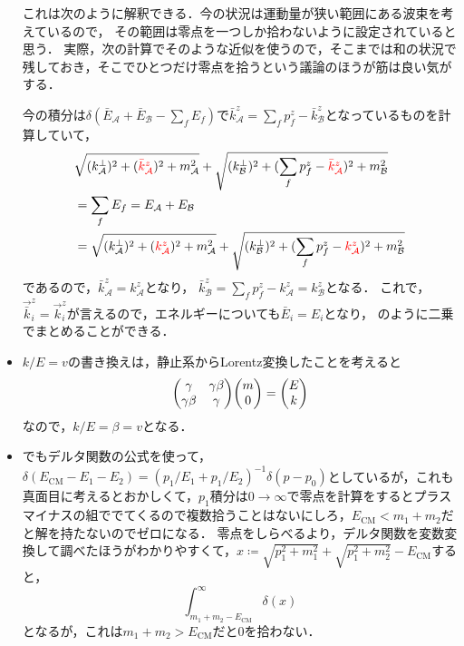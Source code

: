 \begin{itemize}
		これは次のように解釈できる．今の状況は運動量が狭い範囲にある波束を考えているので，
		その範囲は零点を一つしか拾わないように設定されていると思う．
		実際，次の計算でそのような近似を使うので，そこまでは和の状況で残しておき，そこでひとつだけ零点を拾うという議論のほうが筋は良い気がする．

		今の積分は$\delta(\bar{E}_{\mathcal{A}} + \bar{E}_{\mathcal{B}}-\sum_fE_f)$で$\bar{k}_{\mathcal{A}}^z = \sum_fp_f^z - \bar{k}_{\mathcal{B}}^z$となっているものを計算していて，
		\begin{align}
			&\sqrt{(k_{\mathcal{A}}^{\perp})^2+(\textcolor{red}{\bar{k}_{\mathcal{A}}^z})^2+m_{\mathcal{A}}^2} + \sqrt{(k_{\mathcal{B}}^{\perp})^2 + (\sum_fp_f^z-\textcolor{red}{\bar{k}_{\mathcal{A}}^z})^2+m_{\mathcal{B}}^2}\\
			& = \sum_fE_f = E_{\mathcal{A}} + E_{\mathcal{B}}\\
			& = \sqrt{(k_{\mathcal{A}}^{\perp})^2+(\textcolor{red}{k_{\mathcal{A}}^z})^2+m_{\mathcal{A}}^2} + \sqrt{(k_{\mathcal{B}}^{\perp})^2 + (\sum_fp_f^z-\textcolor{red}{k_{\mathcal{A}}^z})^2+m_{\mathcal{B}}^2}
		\end{align}
		であるので，$\bar{k}_{\mathcal{A}}^z = k_{\mathcal{A}}^z$となり，
		$\bar{k}_{\mathcal{B}}^z = \sum_fp_f^z-k_{\mathcal{A}}^z = k_{\mathcal{B}}^z$となる．
		これで，$\vec{\bar{k}}_{i}^z = \vec{k}_i^z$が言えるので，エネルギーについても$\bar{E}_i=E_i$となり，
		のように二乗でまとめることができる．
	\item $k/E = v$の書き換えは，静止系からLorentz変換したことを考えると
		\begin{equation}
			\mqty(\gamma & \gamma\beta\\ \gamma\beta & \gamma)\mqty(m\\0) = \mqty(E\\k)
		\end{equation}
		なので，$k/E = \beta = v$となる．

	\item {}でもデルタ関数の公式を使って，$\delta(E_{\text{CM}}-E_1-E_2)=(p_1/E_1 + p_1/E_2)^{-1}\delta(p-p_0)$としているが，これも真面目に考えるとおかしくて，$p_1$積分は$0\to \infty$で零点を計算をするとプラスマイナスの組ででてくるので複数拾うことはないにしろ，$E_{\text{CM}} < m_1+m_2$だと解を持たないのでゼロになる．
		零点をしらべるより，デルタ関数を変数変換して調べたほうがわかりやすくて\cite{Schwartz:2014sze}，$x\coloneqq \sqrt{p_1^2+m_1^2} + \sqrt{p_1^2 + m_2^2} - E_{\text{CM}}$すると，
		\begin{equation}
		\int_{m_1+m_2-E_{\text{CM}}}^{\infty}\delta(x)
		\end{equation}
		となるが，これは$m_1+m_2 > E_{\text{CM}}$だと$0$を拾わない．
		

\end{itemize}
